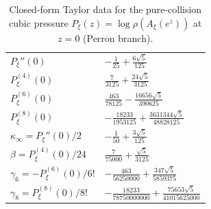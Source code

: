 \begin{table}[H]
\centering
\scriptsize
\setlength{\tabcolsep}{6pt}
\caption{Closed-form Taylor data for the pure-collision cubic pressure $P_\xi(z)=\log\rho(A_\xi(e^{z}))$ at $z=0$ (Perron branch).}
\label{tab:arity_pure_collision_cubic_asymp_coeffs}
\begin{tabular}{l l}
\toprule
$P_\xi''(0)$ & $- \frac{1}{25} + \frac{6 \sqrt{5}}{125}$\\
$P_\xi^{(4)}(0)$ & $\frac{7}{3125} + \frac{24 \sqrt{5}}{3125}$\\
$P_\xi^{(6)}(0)$ & $\frac{463}{78125} - \frac{16656 \sqrt{5}}{390625}$\\
$P_\xi^{(8)}(0)$ & $- \frac{18233}{1953125} + \frac{3631344 \sqrt{5}}{48828125}$\\
$\kappa_\infty=P_\xi''(0)/2$ & $- \frac{1}{50} + \frac{3 \sqrt{5}}{125}$\\
$\beta=P_\xi^{(4)}(0)/24$ & $\frac{7}{75000} + \frac{\sqrt{5}}{3125}$\\
$\gamma_6=-P_\xi^{(6)}(0)/6!$ & $- \frac{463}{56250000} + \frac{347 \sqrt{5}}{5859375}$\\
$\gamma_8=P_\xi^{(8)}(0)/8!$ & $- \frac{18233}{78750000000} + \frac{75653 \sqrt{5}}{41015625000}$\\
\bottomrule
\end{tabular}
\end{table}
